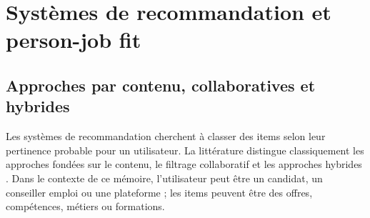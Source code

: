 \section{Systèmes de recommandation et person-job fit}

\subsection{Approches par contenu, collaboratives et hybrides}

Les systèmes de recommandation cherchent à classer des items selon leur pertinence probable pour un utilisateur. La littérature distingue classiquement les approches fondées sur le contenu, le filtrage collaboratif et les approches hybrides \cite{adomavicius2005toward,ricci2011recommender}. Dans le contexte de ce mémoire, l'utilisateur peut être un candidat, un conseiller emploi ou une plateforme ; les items peuvent être des offres, compétences, métiers ou formations.

